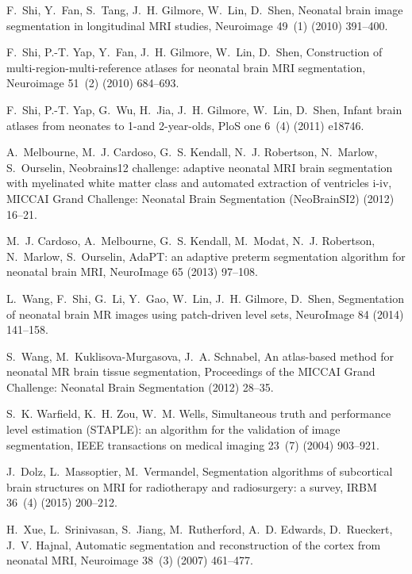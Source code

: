 \documentclass[twoside,espcrc2]{elsarticle}
\begin{document}
\begin{thebibliography}{10}
F.~Shi, Y.~Fan, S.~Tang, J.~H. Gilmore, W.~Lin, D.~Shen, Neonatal brain image
  segmentation in longitudinal {MRI} studies, Neuroimage 49~(1) (2010)
  391--400.

F.~Shi, P.-T. Yap, Y.~Fan, J.~H. Gilmore, W.~Lin, D.~Shen, Construction of
  multi-region-multi-reference atlases for neonatal brain {MRI} segmentation,
  Neuroimage 51~(2) (2010) 684--693.

F.~Shi, P.-T. Yap, G.~Wu, H.~Jia, J.~H. Gilmore, W.~Lin, D.~Shen, Infant brain
  atlases from neonates to 1-and 2-year-olds, PloS one 6~(4) (2011) e18746.

A.~Melbourne, M.~J. Cardoso, G.~S. Kendall, N.~J. Robertson, N.~Marlow,
  S.~Ourselin, Neobrains12 challenge: adaptive neonatal {MRI} brain
  segmentation with myelinated white matter class and automated extraction of
  ventricles i-iv, MICCAI Grand Challenge: Neonatal Brain Segmentation
  (NeoBrainSI2) (2012) 16--21.

M.~J. Cardoso, A.~Melbourne, G.~S. Kendall, M.~Modat, N.~J. Robertson,
  N.~Marlow, S.~Ourselin, {AdaPT}: an adaptive preterm segmentation algorithm
  for neonatal brain {MRI}, NeuroImage 65 (2013) 97--108.

L.~Wang, F.~Shi, G.~Li, Y.~Gao, W.~Lin, J.~H. Gilmore, D.~Shen, Segmentation of
  neonatal brain {MR} images using patch-driven level sets, NeuroImage 84
  (2014) 141--158.

S.~Wang, M.~Kuklisova-Murgasova, J.~A. Schnabel, An atlas-based method for
  neonatal {MR} brain tissue segmentation, Proceedings of the MICCAI Grand
  Challenge: Neonatal Brain Segmentation (2012) 28--35.

S.~K. Warfield, K.~H. Zou, W.~M. Wells, Simultaneous truth and performance
  level estimation ({STAPLE}): an algorithm for the validation of image
  segmentation, IEEE transactions on medical imaging 23~(7) (2004) 903--921.

J.~Dolz, L.~Massoptier, M.~Vermandel, Segmentation algorithms of subcortical
  brain structures on {MRI} for radiotherapy and radiosurgery: a survey, IRBM
  36~(4) (2015) 200--212.

H.~Xue, L.~Srinivasan, S.~Jiang, M.~Rutherford, A.~D. Edwards, D.~Rueckert,
  J.~V. Hajnal, Automatic segmentation and reconstruction of the cortex from
  neonatal {MRI}, Neuroimage 38~(3) (2007) 461--477.


\end{thebibliography}
\end{document}
